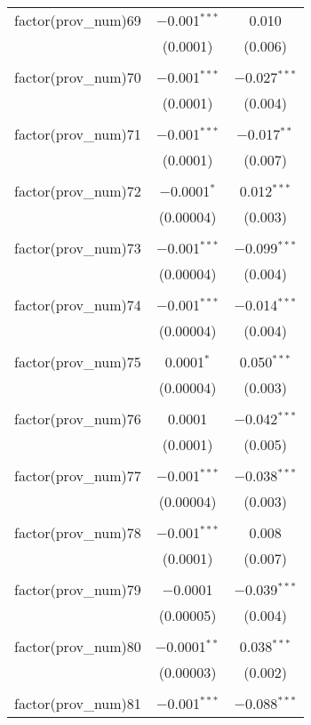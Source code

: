 \begin{table}[ht!]
\begin{tabular}{@{\extracolsep{5pt}}lcc}
 factor(prov\_num)69 & $-$0.001$^{***}$ & 0.010 \\ 
  & (0.0001) & (0.006) \\ 
  & & \\ 
 factor(prov\_num)70 & $-$0.001$^{***}$ & $-$0.027$^{***}$ \\ 
  & (0.0001) & (0.004) \\ 
  & & \\ 
 factor(prov\_num)71 & $-$0.001$^{***}$ & $-$0.017$^{**}$ \\ 
  & (0.0001) & (0.007) \\ 
  & & \\ 
 factor(prov\_num)72 & $-$0.0001$^{*}$ & 0.012$^{***}$ \\ 
  & (0.00004) & (0.003) \\ 
  & & \\ 
 factor(prov\_num)73 & $-$0.001$^{***}$ & $-$0.099$^{***}$ \\ 
  & (0.00004) & (0.004) \\ 
  & & \\ 
 factor(prov\_num)74 & $-$0.001$^{***}$ & $-$0.014$^{***}$ \\ 
  & (0.00004) & (0.004) \\ 
  & & \\ 
 factor(prov\_num)75 & 0.0001$^{*}$ & 0.050$^{***}$ \\ 
  & (0.00004) & (0.003) \\ 
  & & \\ 
 factor(prov\_num)76 & 0.0001 & $-$0.042$^{***}$ \\ 
  & (0.0001) & (0.005) \\ 
  & & \\ 
 factor(prov\_num)77 & $-$0.001$^{***}$ & $-$0.038$^{***}$ \\ 
  & (0.00004) & (0.003) \\ 
  & & \\ 
 factor(prov\_num)78 & $-$0.001$^{***}$ & 0.008 \\ 
  & (0.0001) & (0.007) \\ 
  & & \\ 
 factor(prov\_num)79 & $-$0.0001 & $-$0.039$^{***}$ \\ 
  & (0.00005) & (0.004) \\ 
  & & \\ 
 factor(prov\_num)80 & $-$0.0001$^{**}$ & 0.038$^{***}$ \\ 
  & (0.00003) & (0.002) \\ 
  & & \\ 
 factor(prov\_num)81 & $-$0.001$^{***}$ & $-$0.088$^{***}$ \\ 

\end{tabular}
\end{table}
